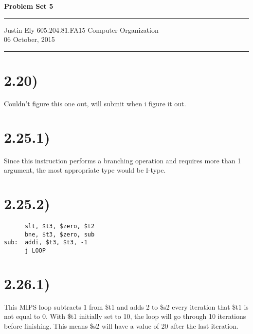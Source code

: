 \documentclass[a4paper,11pt]{article}
\begin{document}
\begin{flushright}

\vspace{1.1cm}

{\bf\Huge Problem Set 5}

\rule{0.25\linewidth}{0.5pt}

\vspace{0.5cm}
Justin Ely
\linebreak
\newline
\footnotesize{605.204.81.FA15 Computer Organization\\}
\vspace{0.5cm}
06 October, 2015
\end{flushright}

\noindent\rule{\linewidth}{1.0pt}



\section*{2.20)}
Couldn't figure this one out, will submit when i figure it out.


\section*{2.25.1)}

Since this instruction performs a branching operation and requires more than 1 argument, the most appropriate type
would be I-type.

\section*{2.25.2)}
\begin{verbatim}
      slt, $t3, $zero, $t2
      bne, $t3, $zero, sub
sub:  addi, $t3, $t3, -1
      j LOOP
\end{verbatim}


\section*{2.26.1)}
This MIPS loop subtracts 1 from \$t1 and adds 2 to \$s2 every iteration that \$t1 is not equal to 0.  With \$t1 initially set to
10, the loop will go through 10 iterations before finishing.  This means \$s2 will have a value of 20 after the last iteration.
\end{document}
